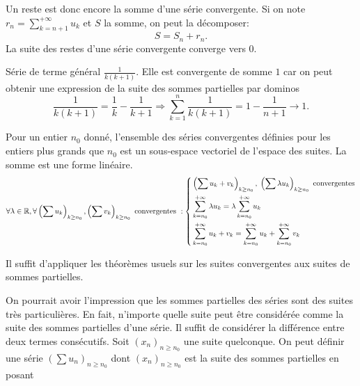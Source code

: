 Un reste est donc encore la somme d'une série convergente. Si on note $r_n = \sum_{k=n+1}^{+\infty} u_k$ et $S$ la somme, on peut la décomposer:
\begin{displaymath}
  S = S_n + r_n .
\end{displaymath}
La suite des restes d'une série convergente converge vers $0$.
\begin{exple}
  Série de terme général $\frac{1}{k(k+1)}$.\newline
  Elle est convergente de somme $1$ car on peut obtenir une expression de la suite des sommes partielles par dominos
  \[
   \frac{1}{k(k+1)} = \frac{1}{k} - \frac{1}{k+1} \Rightarrow \sum_{k=1}^{n}\frac{1}{k(k+1)} = 1 - \frac{1}{n+1} \rightarrow 1.
  \]
\end{exple}

\begin{prop}
  Pour un entier $n_0$ donné, l'ensemble des séries convergentes définies pour les entiers plus grands que $n_0$ est un sous-espace vectoriel de l'espace des suites. La somme est une forme linéaire.
\begin{displaymath}
  \forall\lambda \in \mathbb{R}, \forall \left( \sum u_k \right)_{k\geq n_0}, \left( \sum v_k \right)_{k\geq n_0} \text{ convergentes }:
\left\lbrace 
\begin{aligned}
  &\left( \sum u_k + v_k\right)_{k\geq n_0}, \; \left( \sum \lambda u_k \right)_{k\geq n_0} \text{ convergentes}\\
  &\sum_{k=n_0}^{+\infty} \lambda u_k = \lambda \sum_{k=n_0}^{+\infty}  u_k\\
  &\sum_{k=n_0}^{+\infty} u_k + v_k = \sum_{k=n_0}^{+\infty} u_k + \sum_{k=n_0}^{+\infty}  v_k
\end{aligned}
\right. 
\end{displaymath}
\end{prop}
\begin{demo}
  Il suffit d'appliquer les théorèmes usuels sur les suites convergentes aux suites de sommes partielles.
\end{demo}
On pourrait avoir l'impression que les sommes partielles des séries sont des suites très particulières. En fait, n'importe quelle suite peut être considérée comme la suite des sommes partielles d'une série. Il suffit de considérer la différence entre deux termes consécutifs.\newline
Soit $\left( x_n\right)_{n\geq n_0}$ une suite quelconque. On peut définir une série $\left( \sum u_n\right)_{n\geq n_0}$ dont $\left( x_n\right)_{n\geq n_0}$ est la suite des sommes partielles en posant
